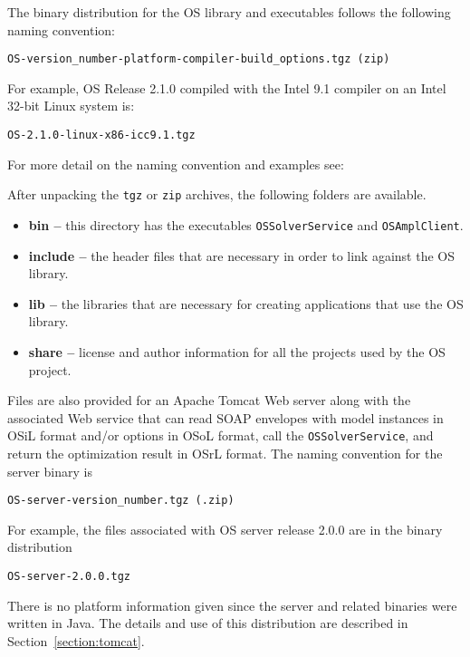 The binary distribution for the OS library and executables follows the following naming convention:


\begin{verbatim}
OS-version_number-platform-compiler-build_options.tgz (zip)
\end{verbatim}
For example, OS  Release 2.1.0 compiled with the Intel 9.1 compiler on an Intel 32-bit Linux system is:
\begin{verbatim}
OS-2.1.0-linux-x86-icc9.1.tgz
\end{verbatim}

For more detail on the naming convention and examples see:

\medskip
\noindent{\tt\UrlCoinNames}
\medskip

After unpacking the {\tt tgz} or {\tt zip} archives, the following folders are available.
\begin{itemize}

\item[] {\bf bin --} this directory has the executables {\tt OSSolverService} 
and {\tt OSAmplClient}.

\item[]  {\bf include --} the header files that are necessary in order to link against the OS library.

\item[] {\bf lib --} the libraries that are necessary for creating applications that use the OS library.

\item[] {\bf  share --} license and author information for all the projects used by the OS project.
\end{itemize}



Files are also provided for an Apache Tomcat Web server along with the associated Web service
that can
read SOAP  envelopes with model instances in OSiL format and/or options in 
OSoL format, call the {\tt OSSolverService},
and return the optimization result in OSrL format.
The naming convention for the server binary is
\begin{verbatim}
OS-server-version_number.tgz (.zip)
\end{verbatim}
For example, the files associated with  OS server release 2.0.0 are in the binary distribution
\begin{verbatim}
OS-server-2.0.0.tgz
\end{verbatim}
There is no platform information given since the server and related binaries were written in Java.
The details and use of this distribution are described in Section~\ref{section:tomcat}.



